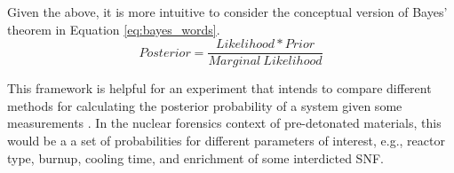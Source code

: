 
Given the above, it is more intuitive to consider the conceptual version of
Bayes' theorem in Equation \ref{eq:bayes_words}.
\begin{equation}
  \label{eq:bayes_words}
  Posterior = \frac{Likelihood * Prior}{Marginal \ Likelihood} 
\end{equation} 

This framework is helpful for an experiment that intends to compare different
methods for calculating the posterior probability of a system given some
measurements \cite{bayes_compare}.  In the nuclear forensics context of
pre-detonated materials, this would be a a set of probabilities for different
parameters of interest, e.g., reactor type, burnup, cooling time, and
enrichment of some interdicted \gls{SNF}.
